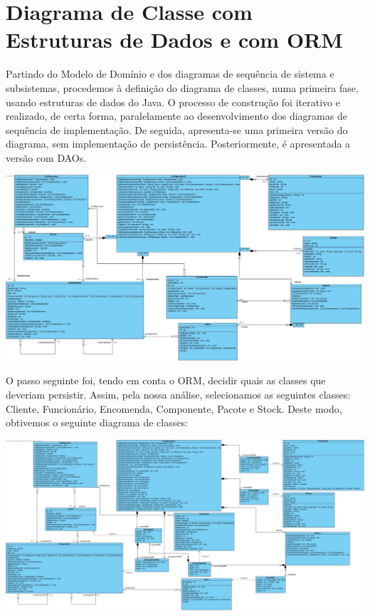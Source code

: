 \section{Diagrama de Classe com Estruturas de Dados e com ORM}
Partindo do Modelo de Domínio e dos diagramas de sequência de sistema e subsistemas, procedemos à definição do diagrama de classes, numa primeira fase, usando estruturas de dados do Java. O processo de construção foi iterativo e realizado, de certa forma, paralelamente ao desenvolvimento dos diagramas de sequência de implementação. De seguida, apresenta-se uma primeira versão do diagrama, sem implementação de persistência. Posteriormente, é apresentada a versão com DAOs. 
\begin{center}
 	\includegraphics[width=6in]{VPP/Diagrama_de_Classes.jpg}
\end{center}

\newpage
O passo seguinte foi, tendo em conta o ORM, decidir quais as classes que deveriam persistir. Assim, pela nossa análise, selecionamos as seguintes classes: Cliente, Funcionário, Encomenda, Componente, Pacote e Stock. Deste modo, obtivemos o seguinte diagrama de classes:

\begin{center}
 	\includegraphics[width=6in]{VPP/diagramadao.jpg}
\end{center}
\newpage
